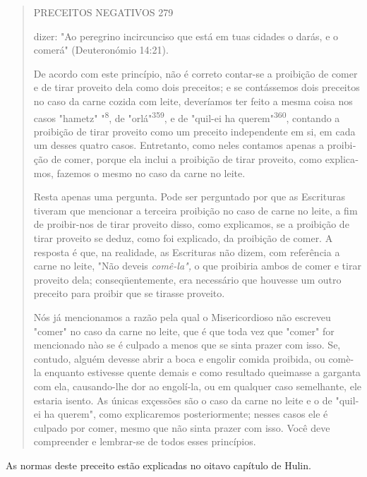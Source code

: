 \begin{quote}
PRECEITOS NEGATIVOS 279

dizer: "Ao peregrino incircunciso que está em tuas cidades o darás, e o
come­rá" (Deuteronómio 14:21).

De acordo com este princípio, não é correto contar-se a proibição de
comer e de tirar proveito dela como dois preceitos; e se contássemos
dois preceitos no caso da carne cozida com leite, deveríamos ter feito a
mesma coi­sa nos casos "hametz" "\textsuperscript{8}, de
"orlá"\textsuperscript{359}, e de "quil-ei ha
querem"\textsuperscript{360}, contan­do a proibição de tirar proveito
como um preceito independente em si, em ca­da um desses quatro casos.
Entretanto, como neles contamos apenas a proibi­ção de comer, porque ela
inclui a proibição de tirar proveito, como explica­mos, fazemos o mesmo
no caso da carne no leite.

Resta apenas uma pergunta. Pode ser perguntado por que as Escritu­ras
tiveram que mencionar a terceira proibição no caso de carne no leite, a
fim de proibir-nos de tirar proveito disso, como explicamos, se a
proibição de tirar proveito se deduz, como foi explicado, da proibição
de comer. A resposta é que, na realidade, as Escrituras não dizem, com
referência a carne no leite, "Não deveis \emph{comê-la",} o que
proibiria ambos de comer e tirar proveito dela; conse­qüentemente, era
necessário que houvesse um outro preceito para proibir que se tirasse
proveito.

Nós já mencionamos a razão pela qual o Misericordioso não escre­veu
"comer" no caso da carne no leite, que é que toda vez que "comer" for
mencionado nào se é culpado a menos que se sinta prazer com isso. Se,
contu­do, alguém devesse abrir a boca e engolir comida proibida, ou
comè-la enquanto estivesse quente demais e como resultado queimasse a
garganta com ela, causando-lhe dor ao engolí-la, ou em qualquer caso
semelhante, ele estaria isento. As únicas exçessões são o caso da carne
no leite e o de "quil-ei ha querem", como explicaremos posteriormente;
nesses casos ele é culpado por comer, mes­mo que não sinta prazer com
isso. Você deve compreender e lembrar-se de to­dos esses princípios.
\end{quote}

As normas deste preceito estão explicadas no oitavo capítulo de Hulin.

